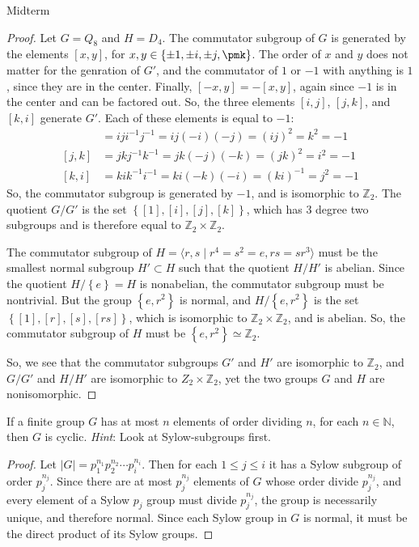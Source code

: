 \documentclass[12pt]{article}
\newcommand{\N}{\mathbb{N}}
\newcommand{\Z}{\mathbb{Z}}
\theoremstyle{definition}
\newenvironment{problem}[2][Problem]{\begin{trivlist}
\item[\hskip \labelsep {\bfseries #1}\hskip \labelsep {\bfseries #2.}]}{\end{trivlist}}
\begin{document}
\begin{section}{Midterm}
\begin{problem}{8}
	\begin{proof}
		Let $G= Q_8$ and $H = D_4$. The commutator subgroup of $G$ is generated by the elements $[x,y]$, for $x, y \in \left\{ \pm 1, \pm i, \pm j, \pmk \right\}$. The order of $x$ and $y$ does not matter for the genration of $G'$, and the commutator of $1$ or $-1$ with anything is $1$, since they are in the center. Finally, $[-x, y] = -[x,y]$, again since $-1$ is in the center and can be factored out. So, the three elements $[i,j]$, $[j, k]$, and $[k,i]$ generate $G'$. Each of these elements is equal to $-1$:
		\begin{align*}
			[i,j] &= iji^{-1}j^{-1} = ij(-i)(-j) = (ij)^{2} = k^2 = -1\\
			[j, k] &= jkj^{-1}k^{-1} = jk(-j)(-k) = (jk)^{2} = i^2 = -1\\
		[k, i] &= kik^{-1}i^{-1} = ki(-k)(-i) = (ki)^{-1} = j^2 = -1
		\end{align*}
		So, the commutator subgroup is generated by $-1$, and is isomorphic to $\Z_2$. The quotient $G/G'$ is the set $\left\{ [1], [i], [j], [k] \right\}$, which has $3$ degree two subgroups and is therefore equal to $\Z_2 \times \Z_2$.
		\par The commutator subgroup of $H = \langle r, s \mid r^4 = s^2 = e, rs = sr^3\rangle$ must be the smallest normal subgroup $H' \subset H$ such that the quotient $H/H'$ is abelian. Since the quotient $H/\left\{ e \right\} = H$ is nonabelian, the commutator subgroup must be nontrivial. But the group $\left\{ e, r^2 \right\}$ is normal, and $H / \left\{ e, r^2 \right\}$ is the set $\left\{ [1], [r], [s], [rs] \right\}$, which is isomorphic to $\Z_2 \times \Z_2$, and is abelian. So, the commutator subgroup of $H$ must be $\left\{ e, r^2 \right\} \simeq \Z_2$.
		\par So, we see that the commutator subgroups $G'$ and $H'$ are isomorphic to $\Z_2$, and $G/G'$ and $H/H'$ are isomorphic to $Z_2 \times \Z_2$, yet the two groups $G$ and $H$ are nonisomorphic.
	\end{proof}
\end{problem}
\begin{problem}{9}
	If a finite group $G$ has at most $n$ elements of order dividing $n$, for each $n\in \N$, then $G$ is cyclic. \textit{Hint}: Look at Sylow-subgroups first.
	\begin{proof}
		Let $\left \lvert {  G } \right \lvert  = p_1^{n_1}p_2^{n_2} \cdots p_i^{n_i}$. Then for each $1 \leq j \leq i$ it has a Sylow subgroup of order $p_j^{n_j}$. Since there are at most $p_j^{n_j}$ elements of $G$ whose order divide $p_j^{n_j}$, and every element of a Sylow $p_j$ group must divide $p_j^{n_j}$, the group is necessarily unique, and therefore normal. Since each Sylow group in $G$ is normal, it must be the direct product of its Sylow groups.

\end{proof}
\end{problem}
\end{section}
\end{document}
